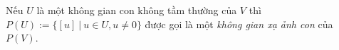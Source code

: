 \begin{defn}
    Nếu $U $ là một không gian con không tầm thường của $V$ thì $P(U):=\{[u]~|~u\in U, u\neq 0\}$ được gọi là một \textit{không gian xạ ảnh con} của $P(V)$.
\end{defn}
